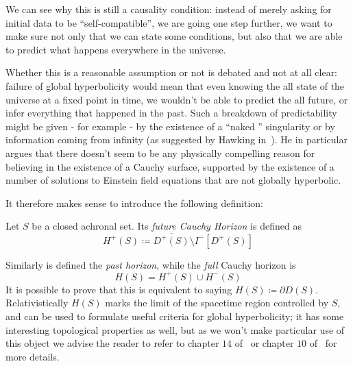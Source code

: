 We can see why this is still a causality condition: instead of merely asking for initial data to be ``self-compatible'', we are going one step further, we want to make sure not only that we can state some conditions, but also that we are able to predict what happens everywhere in the universe. 

Whether this is a reasonable assumption or not is debated and not at all clear: failure of global hyperbolicity would mean that even knowing the all state of the universe at a fixed point in time, we wouldn't be able to predict the all future, or infer everything that happened in the past. Such a breakdown of predictability might be given - for example - by the existence of a ``naked '' singularity or by information coming from infinity (as suggested by Hawking in~\cite{hawking1973large}). He in particular argues that there doesn't seem to be any physically compelling reason for believing in the existence of a Cauchy surface, supported by the existence of a number of solutions to Einstein field equations that are not globally hyperbolic.

It therefore makes sense to introduce the following definition:
\begin{definition}
	Let \(S\) be a closed achronal set. Its \emph{future Cauchy Horizon} is defined as 
	\[
	H^+(S) \coloneqq \overline{D^+(S)} \setminus I^-[D^+(S)]	
	\]
\end{definition}
	Similarly is defined the \emph{past horizon}, while the \emph{full} Cauchy horizon is
	\[
	H(S) = 	H^+(S) \cup H^-(S)
	\]
	It is possible to prove that this is equivalent to saying \(H(S) \coloneqq \partial D(S)\). Relativistically \(H(S)\) marks the limit of the spacetime region controlled by \(S\), and can be used to formulate useful criteria for global hyperbolicity; it has some interesting topological properties as well, but as we won't make particular use of this object we advise the reader to refer to chapter \(14\) of~\cite{o1983semi} or chapter \(10\) of~\cite{wald2010general} for more details.